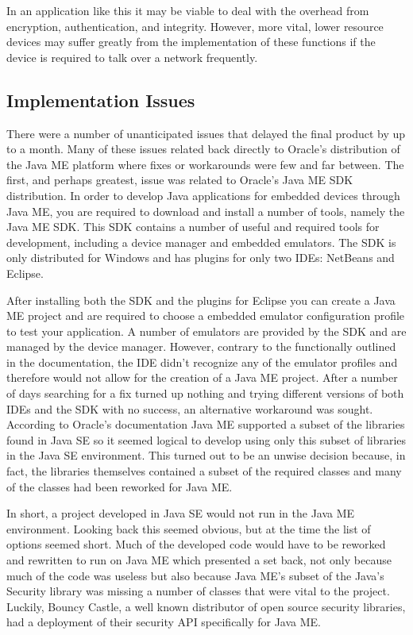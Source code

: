 In an application like this it may be viable to deal with the overhead from encryption, authentication, and integrity. However, more vital, lower resource devices may suffer greatly from the implementation of these functions if the device is required to talk over a network frequently. 

\subsection{Implementation Issues}
There were a number of unanticipated issues that delayed the final product by up to a month. Many of these issues related back directly to Oracle's distribution of the Java ME platform where fixes or workarounds were few and far between. The first, and perhaps greatest, issue was related to Oracle's Java ME SDK distribution. In order to develop Java applications for embedded devices through Java ME, you are required to download and install a number of tools, namely the Java ME SDK. This SDK contains a number of useful and required tools for development, including a device manager and embedded emulators. The SDK is only distributed for Windows and has plugins for only  two IDEs: NetBeans and Eclipse.

 After installing both the SDK and the plugins for Eclipse you can create a Java ME project and are required to choose a embedded emulator configuration profile to test your application. A number of emulators are provided by the SDK and are managed by the device manager. However, contrary to the functionally outlined in the documentation, the IDE didn't recognize any of the emulator profiles and therefore would not allow for the creation of a Java ME project. After a number of days searching for a fix turned up nothing and trying different versions of both IDEs and the SDK with no success, an alternative workaround was sought. According to Oracle's documentation Java ME supported a subset of the libraries found in Java SE so it seemed logical to develop using only this subset of libraries in the Java SE environment. This turned out to be an unwise decision because, in fact, the libraries themselves contained a subset of the required classes and many of the classes had been reworked for Java ME.
 
 In short, a project developed in Java SE would not run in the Java ME environment. Looking back this seemed obvious, but at the time the list of options seemed short. Much of the developed code would have to be reworked and rewritten to run on Java ME which presented a set back, not only because much of the code was useless but also because Java ME's subset of the Java's Security library was missing a number of classes that were vital to the project. Luckily, Bouncy Castle, a well known distributor of open source security libraries, had a deployment of their security API specifically for Java ME. 
 
